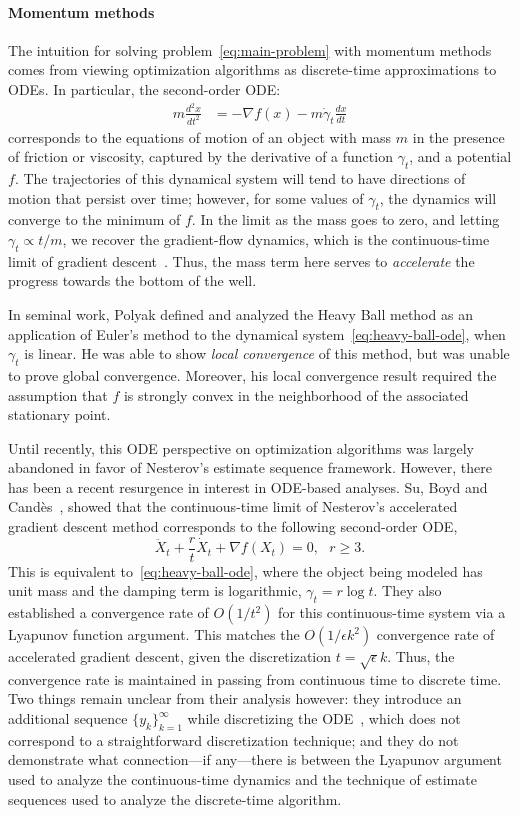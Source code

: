 \documentclass[11pt]{article}
\theoremstyle{plain}
\begin{document}
\paragraph{Momentum methods}
The intuition for solving problem~\eqref{eq:main-problem} with momentum methods comes from viewing optimization algorithms as discrete-time approximations to ODEs. In particular, the second-order ODE:
 \begin{align}\label{eq:heavy-ball-ode}
 m \frac{d^2x}{dt^2}& = - \nabla f(x) - m \dot \gamma_t \frac{dx}{dt}
 \end{align}
corresponds to the equations of motion of an object with mass $m$ in the presence of  friction or viscosity, captured by the derivative of a function $\gamma_t$, and a potential $f$. The trajectories of this dynamical system will tend to have directions of motion that persist over time; however, for some values of $\gamma_t$, the dynamics will converge to the minimum of $f$.  In the limit as the mass goes to zero, and letting $\gamma_t \propto t/m$, we recover the gradient-flow dynamics, which is the continuous-time limit of gradient descent~\cite{Acceleration}.  Thus, the mass term here serves to \emph{accelerate} the progress towards the bottom of the well. 

In seminal work, Polyak defined and analyzed the Heavy Ball method as an application of Euler's method to the dynamical system~\eqref{eq:heavy-ball-ode}, when $\gamma_t$ is linear.  He was able to show \emph{local convergence} of this method, but was unable to prove global convergence.  Moreover, his local convergence result required the assumption that $f$ is strongly convex in the neighborhood of the associated stationary point.

Until recently, this ODE perspective on optimization algorithms was largely abandoned in favor of Nesterov's estimate sequence framework.  However, there has been a recent resurgence in interest in ODE-based analyses.  Su, Boyd and Cand\`es~\cite{SuBoydCandes14}, showed that the continuous-time limit of Nesterov's accelerated gradient descent method corresponds to the following second-order ODE, 
 \begin{equation}\label{Eq:SuBoydCandes}
 \ddot X_t + \frac{r}{t} \dot X_t + \nabla f(X_t) = 0,\,\,\,\,r \geq 3.
 \end{equation}
This is equivalent to~\eqref{eq:heavy-ball-ode}, where the object being modeled has unit mass and the damping term is logarithmic, $\gamma_t = r\log t$.  They also established a convergence rate of $O(1/t^2)$ for this continuous-time system via a Lyapunov function argument. This matches the $O(1/\epsilon k^2)$ convergence rate of accelerated gradient descent, given the discretization $t= \sqrt\epsilon k$. Thus, the convergence rate is maintained in passing from continuous time to discrete time. Two things remain unclear from their analysis however:  they introduce an additional sequence $\{y_k\}_{k=1}^\infty$ while discretizing the ODE~\cite[Sec 2]{Acceleration},  which does not correspond to a straightforward discretization technique; and they do not demonstrate what connection---if any---there is between the Lyapunov argument used to analyze the continuous-time dynamics and the technique of estimate sequences used to analyze the discrete-time algorithm. 
\end{document}
